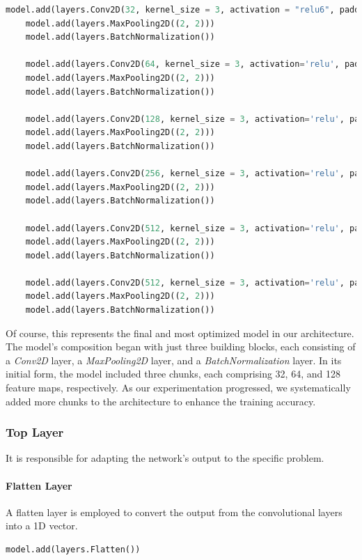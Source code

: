 \begin{lstlisting}[language=Python]
	model.add(layers.Conv2D(32, kernel_size = 3, activation = "relu6", padding = "same", input_shape = (256, 256,3)))
	model.add(layers.MaxPooling2D((2, 2)))
	model.add(layers.BatchNormalization())

	model.add(layers.Conv2D(64, kernel_size = 3, activation='relu', padding = "same"))
	model.add(layers.MaxPooling2D((2, 2)))
	model.add(layers.BatchNormalization())

	model.add(layers.Conv2D(128, kernel_size = 3, activation='relu', padding = "same"))
	model.add(layers.MaxPooling2D((2, 2)))
	model.add(layers.BatchNormalization())

	model.add(layers.Conv2D(256, kernel_size = 3, activation='relu', padding = "same"))
	model.add(layers.MaxPooling2D((2, 2)))
	model.add(layers.BatchNormalization())

	model.add(layers.Conv2D(512, kernel_size = 3, activation='relu', padding = "same"))
	model.add(layers.MaxPooling2D((2, 2)))
	model.add(layers.BatchNormalization())

	model.add(layers.Conv2D(512, kernel_size = 3, activation='relu', padding = "same"))
	model.add(layers.MaxPooling2D((2, 2)))
	model.add(layers.BatchNormalization())
\end{lstlisting}

Of course, this represents the final and most optimized model in our architecture. The model's composition began with 
just three building blocks, each consisting of a \textit{Conv2D} layer, a \textit{MaxPooling2D} layer, and a 
\textit{BatchNormalization} layer. In its initial form, the model included three chunks, each comprising 32, 64, and 128 
feature maps, respectively. As our experimentation progressed, we systematically added more chunks to the architecture 
to enhance the training accuracy.

\subsubsection{Top Layer}
It is responsible for adapting the network's output to the specific problem.

\paragraph{Flatten Layer}
A flatten layer is employed to convert the output from the convolutional layers into a 1D vector.

\begin{lstlisting}[language=Python]
	model.add(layers.Flatten())
\end{lstlisting}

